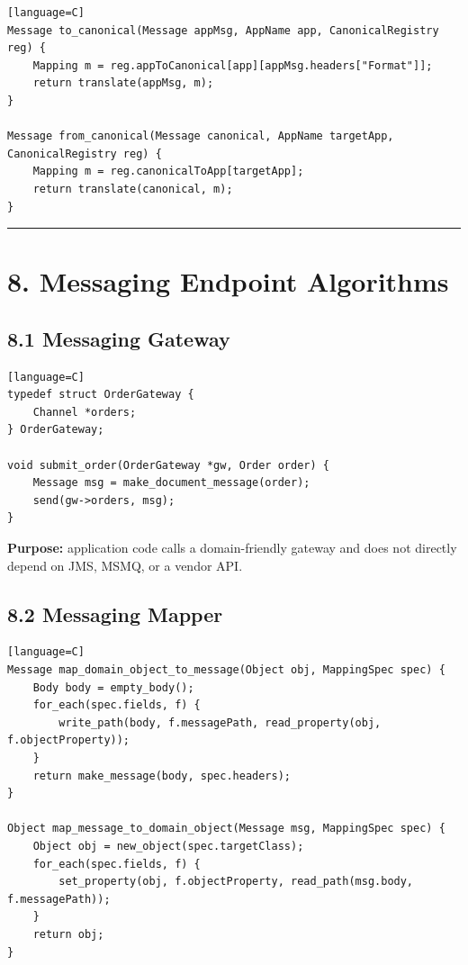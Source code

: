 \documentclass[11pt]{article}
\begin{document}
\begin{verbatim}[language=C]
Message to_canonical(Message appMsg, AppName app, CanonicalRegistry reg) {
    Mapping m = reg.appToCanonical[app][appMsg.headers["Format"]];
    return translate(appMsg, m);
}

Message from_canonical(Message canonical, AppName targetApp, CanonicalRegistry reg) {
    Mapping m = reg.canonicalToApp[targetApp];
    return translate(canonical, m);
}
\end{verbatim}

\begin{center}\rule{0.5\linewidth}{0.5pt}\end{center}

\section{8. Messaging Endpoint
Algorithms}\label{messaging-endpoint-algorithms}

\subsection{8.1 Messaging Gateway}\label{messaging-gateway}

\begin{verbatim}[language=C]
typedef struct OrderGateway {
    Channel *orders;
} OrderGateway;

void submit_order(OrderGateway *gw, Order order) {
    Message msg = make_document_message(order);
    send(gw->orders, msg);
}
\end{verbatim}

\textbf{Purpose:} application code calls a domain-friendly gateway and
does not directly depend on JMS, MSMQ, or a vendor API.

\subsection{8.2 Messaging Mapper}\label{messaging-mapper}

\begin{verbatim}[language=C]
Message map_domain_object_to_message(Object obj, MappingSpec spec) {
    Body body = empty_body();
    for_each(spec.fields, f) {
        write_path(body, f.messagePath, read_property(obj, f.objectProperty));
    }
    return make_message(body, spec.headers);
}

Object map_message_to_domain_object(Message msg, MappingSpec spec) {
    Object obj = new_object(spec.targetClass);
    for_each(spec.fields, f) {
        set_property(obj, f.objectProperty, read_path(msg.body, f.messagePath));
    }
    return obj;
}
\end{verbatim}
\end{document}
